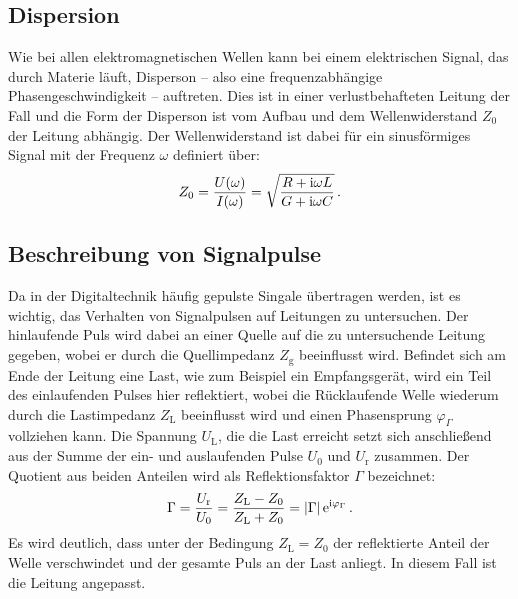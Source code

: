 \subsection{Dispersion} %
\label{sub:dispersion}
Wie bei allen elektromagnetischen Wellen kann bei einem elektrischen Signal,
das durch Materie läuft, Disperson -- also eine frequenzabhängige
Phasengeschwindigkeit -- auftreten.
Dies ist in einer verlustbehafteten Leitung der Fall und die Form der Disperson
ist vom Aufbau und dem Wellenwiderstand $Z_0$ der Leitung abhängig.
Der Wellenwiderstand ist dabei für ein sinusförmiges Signal mit der Frequenz
$\omega$ definiert über:
\begin{equation*}
    Z_0 = \frac{U(\omega)}{I(\omega)}=\sqrt{\frac{R+\mathrm{i}\omega L}{G+\mathrm{i}\omega C}}\,.
\end{equation*}

\subsection{Beschreibung von Signalpulse} %
\label{sub:signalpulse}
Da in der Digitaltechnik häufig gepulste Singale übertragen werden, ist es
wichtig, das Verhalten von Signalpulsen auf Leitungen zu untersuchen.
Der hinlaufende Puls wird dabei an einer Quelle auf die zu untersuchende
Leitung gegeben, wobei er durch die Quellimpedanz $Z_\text{g}$ beeinflusst
wird.
Befindet sich am Ende der Leitung eine Last, wie zum Beispiel ein
Empfangsgerät, wird ein Teil des einlaufenden Pulses hier reflektiert, wobei
die Rücklaufende Welle wiederum durch die Lastimpedanz $Z_\text{L}$
beeinflusst wird und einen Phasensprung $\varphi_\Gamma$ vollziehen kann.
Die Spannung $U_\text{L}$, die die Last erreicht setzt sich anschließend aus
der Summe der ein- und auslaufenden Pulse $U_0$ und $U_\text{r}$ zusammen.
Der Quotient aus beiden Anteilen wird als Reflektionsfaktor $\Gamma$
bezeichnet:
\begin{equation*}
    \Gamma = \frac{U_\text{r}}{U_0} = \frac{Z_\text{L} - Z_0}{Z_\text{L} + Z_0} = \left|\Gamma\right|\mathrm{e}^{\mathrm{i}\varphi_\Gamma}\,.
\end{equation*}
Es wird deutlich, dass unter der Bedingung $Z_\text{L} = Z_0$ der reflektierte
Anteil der Welle verschwindet und der gesamte Puls an der Last anliegt.
In diesem Fall ist die Leitung angepasst.

